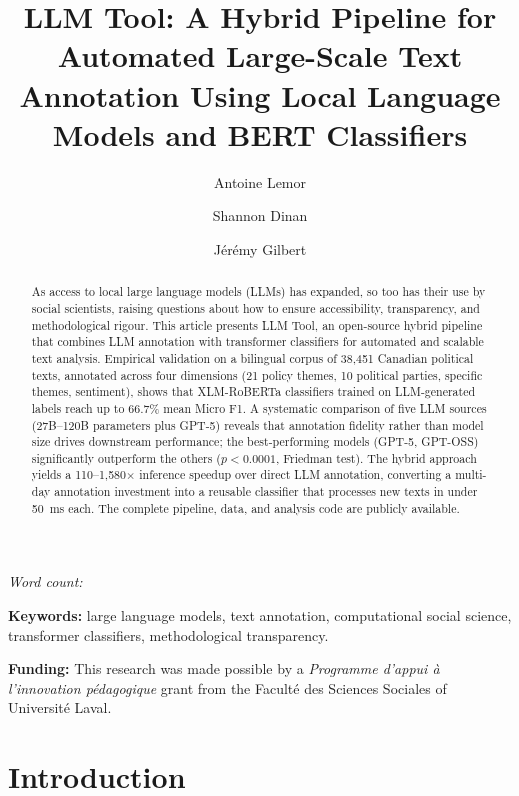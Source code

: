 \documentclass[12pt]{article}
\title{\textbf{LLM Tool: A Hybrid Pipeline for Automated Large-Scale Text Annotation Using Local Language Models and BERT Classifiers}}
\author[1]{Antoine Lemor}
\author[2]{Shannon Dinan}
\author[3]{Jérémy Gilbert}
\affil[1]{Université de Montréal}
\affil[2]{Université Laval}
\affil[3]{Western University}
\date{}
\begin{document}
\maketitle
\thispagestyle{empty}

\immediate{}
\begin{center}
\small\textit{Word count: }
\end{center}

\begin{abstract}
\noindent
As access to local large language models (LLMs) has expanded, so too has their use by social scientists, raising questions about how to ensure accessibility, transparency, and methodological rigour. This article presents LLM Tool, an open-source hybrid pipeline that combines LLM annotation with transformer classifiers for automated and scalable text analysis. Empirical validation on a bilingual corpus of 38,451 Canadian political texts, annotated across four dimensions (21 policy themes, 10 political parties, specific themes, sentiment), shows that XLM-RoBERTa classifiers trained on LLM-generated labels reach up to 66.7\% mean Micro F1. A systematic comparison of five LLM sources (27B--120B parameters plus GPT-5) reveals that annotation fidelity rather than model size drives downstream performance; the best-performing models (GPT-5, GPT-OSS) significantly outperform the others ($p < 0.0001$, Friedman test). The hybrid approach yields a 110--1,580$\times$ inference speedup over direct LLM annotation, converting a multi-day annotation investment into a reusable classifier that processes new texts in under 50~ms each. The complete pipeline, data, and analysis code are publicly available.
\end{abstract}

\noindent\textbf{Keywords:} large language models, text annotation, computational social science, transformer classifiers, methodological transparency.

\vspace{0.4cm}

\noindent\textbf{Funding:} This research was made possible by a \textit{Programme d’appui à l’innovation pédagogique} grant from the Faculté des Sciences Sociales of Université Laval. 
\newpage

\section{Introduction}
\end{document}
